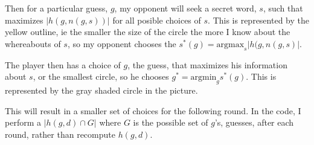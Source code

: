 \documentclass[11pt]{article}
\begin{document}
Then for a particular guess, \(g\), my opponent will seek a secret word,
\(s\), such that maximizes \(|h(g, n(g,s))|\) for all posible choices of
\(s\).  This is represented by the yellow outline, ie the smaller the
size of the circle the more I know about the whereabouts of \(s\), so my
opponent chooses the \(s^*(g) = \textrm{argmax}_s |h(g, n(g,s)|\).

The player then has a choice of \(g\), the guess, that maximizes his
information about \(s\), or the smallest circle, so he chooses \(g^* =
\textrm{argmin}_g s^*(g)\).  This is represented by the gray shaded
circle in the picture.

This will result in a smaller set of choices for the following round.
In the code, I perform a \(|h(g, d) \cap G|\) where \(G\) is the
possible set of \(g\)'s, guesses, after each round, rather than
recompute \(h(g, d)\).
\end{document}
